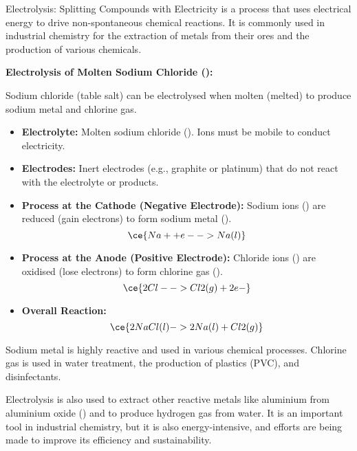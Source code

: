 \begin{keyconcept}{Electrolysis: Splitting Compounds with Electricity}
 is a process that uses electrical energy to drive non-spontaneous chemical reactions.  It is commonly used in industrial chemistry for the extraction of metals from their ores and the production of various chemicals.

\textbf{Electrolysis of Molten Sodium Chloride ():}

Sodium chloride (table salt) can be electrolysed when molten (melted) to produce sodium metal and chlorine gas.

\begin{itemize}
    \item \textbf{Electrolyte:} Molten sodium chloride ().  Ions must be mobile to conduct electricity.
    \item \textbf{Electrodes:} Inert electrodes (e.g., graphite or platinum) that do not react with the electrolyte or products.
    \item \textbf{Process at the Cathode (Negative Electrode):} Sodium ions () are reduced (gain electrons) to form sodium metal ().
    \[\ce{Na+ + e- -> Na(l)}\]
    \item \textbf{Process at the Anode (Positive Electrode):} Chloride ions () are oxidised (lose electrons) to form chlorine gas ().
    \[\ce{2Cl- -> Cl2(g) + 2e-}\]
    \item \textbf{Overall Reaction:}
    \[\ce{2NaCl(l) -> 2Na(l) + Cl2(g)}\]
\end{itemize}

Sodium metal is highly reactive and used in various chemical processes. Chlorine gas is used in water treatment, the production of plastics (PVC), and disinfectants.

Electrolysis is also used to extract other reactive metals like aluminium from aluminium oxide () and to produce hydrogen gas from water.  It is an important tool in industrial chemistry, but it is also energy-intensive, and efforts are being made to improve its efficiency and sustainability.
\end{keyconcept}

